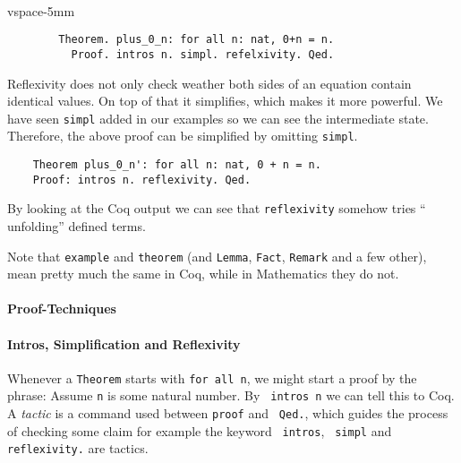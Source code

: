    \begin{example}
	   \begin{theorem} ~\\vspace{-5mm}
  	   \begin{lstlisting}
   		Theorem. plus_0_n: for all n: nat, 0+n = n.
   		  Proof. intros n. simpl. refelxivity. Qed.
    	\end{lstlisting}	
	\end{theorem}
	\end{example}              
    \begin{remark}
    	Reflexivity does not only check weather both sides of an equation contain identical values. 
    	On top of that it simplifies, which makes it more powerful. 
    	We have seen \lstinline!simpl! added in our examples so we can see the intermediate state.
    	Therefore, the above proof can be simplified by omitting \lstinline!simpl!. 
     \end{remark}


	\begin{lstlisting}
    Theorem plus_0_n': for all n: nat, 0 + n = n.
    Proof: intros n. reflexivity. Qed.	
    \end{lstlisting}
    
    By looking at the Coq output we can see that \lstinline!reflexivity! somehow tries ``	unfolding'' defined terms.
    
    Note that \lstinline!example! and \lstinline!theorem! (and \lstinline!Lemma!, \lstinline!Fact!, \lstinline!Remark! and a few other),
    mean pretty much the same in Coq, while in Mathematics they do not.
    
   
     
    \paragraph{Proof-Techniques}
    
    \paragraph{Intros, Simplification and Reflexivity}
     Whenever a \lstinline!Theorem! starts with \lstinline!for all n!, we might start a proof by the phrase:
     Assume \lstinline!n! is some natural number. By \lstinline! intros n! we can tell this to Coq.\\
     A {\itshape tactic} is a command used between \lstinline!proof! and \lstinline! Qed.!, 
     which guides the process of checking some claim for example the keyword \lstinline! intros!, \lstinline! simpl! and \lstinline!reflexivity.! 
     are tactics.
     
